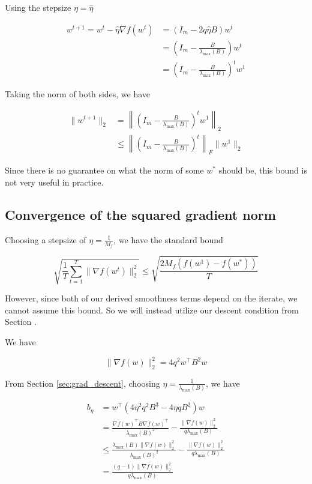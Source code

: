 \documentclass[11pt]{article}
\begin{document}
Using the stepsize $\eta = \hat{\eta}$

\begin{align*}
    w^{t+1} = w^t - \hat{\eta} \nabla f(w^t)
    &= (I_m - 2q \hat{\eta} B)w^t \\
    &= \left( I_m - \frac{B}{\lambda_{\max}(B)} \right) w^t \\
    &= \left( I_m - \frac{B}{\lambda_{\max}(B)} \right)^t w^1
\end{align*}

Taking the norm of both sides, we have

\begin{align*}
    \|w^{t+1}\|_2 &= \left\|\left( I_m - \frac{B}{\lambda_{\max}(B)} \right)^t w^1 \right\|_2 \\
    &\leq \left\|\left( I_m - \frac{B}{\lambda_{\max}(B)} \right)^t \right\|_F \|w^1\|_2
\end{align*}

Since there is no guarantee on what the norm of some $w^*$ should be, this bound is not very useful in practice.

\subsection{Convergence of the squared gradient norm}


Choosing a stepsize of $\eta = \frac{1}{M_f}$, we have the standard bound

\begin{equation}
    \sqrt{\frac{1}{T} \sum_{t=1}^{T} \| \nabla f(w^t) \|_2^2} \leq \sqrt{\frac{2 M_f (f(w^1) - f(w^*))}{T}}
\end{equation}

However, since both of our derived smoothness terms depend on the iterate, we cannot assume this bound. So we will instead utilize our descent condition from Section \label{sec:grad_descent}.

We have

\begin{equation}
    \| \nabla f(w) \|_2^2 = 4 q^2 w^{\top} B^2 w
\end{equation}

From Section \ref{sec:grad_descent}, choosing $\eta = \frac{1}{\lambda_{\max}(B)}$, we have

\begin{align*}
    b_\eta &= w^{\top} ( 4 \eta^2 q^2 B^3 - 4 \eta q B^2)w \\
    &= \frac{\nabla f(w)^{\top} B \nabla f(w)^{\top}}{\lambda_{\max}(B)^2} - \frac{\| \nabla f(w) \|_2^2}{q \lambda_{\max}(B)} \\
    &\leq \frac{ \lambda_{\max}(B) \| \nabla f(w) \|_2^2}{\lambda_{\max}(B)^2} - \frac{\| \nabla f(w) \|_2^2}{q \lambda_{\max}(B)}\\
    &= \frac{(q-1) \| \nabla f(w) \|_2^2}{q \lambda_{\max}(B)}
\end{align*}
\end{document}
